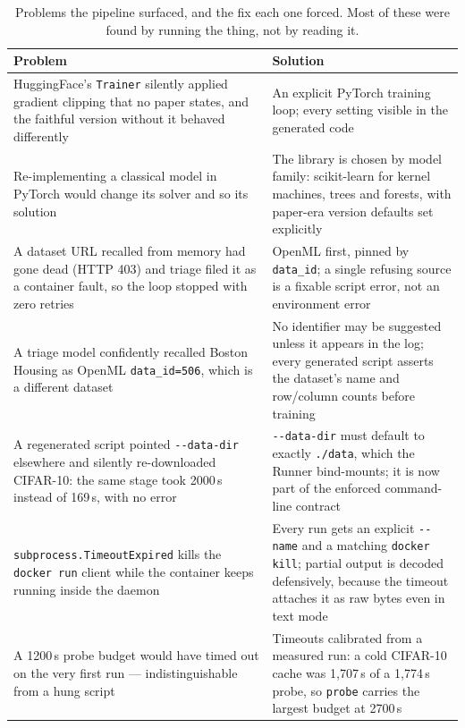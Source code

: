 \documentclass[10pt,twocolumn]{article}
\newcommand{\squeeze}{\setlength{\tabcolsep}{4pt}}
\begin{document}
\begin{table}[tbp]
\centering
\small
\caption{Problems the pipeline surfaced, and the fix each one forced. Most of these were found by
running the thing, not by reading it.}
\label{tab:problems}
\squeeze
\begin{tabular}{L{0.47\textwidth}L{0.47\textwidth}}
\toprule
Problem & Solution \\
\midrule
HuggingFace's \texttt{Trainer} silently applied gradient clipping that no paper states, and the
  faithful version without it behaved differently & An explicit PyTorch training loop; every
  setting visible in the generated code \\
Re-implementing a classical model in PyTorch would change its solver and so its solution & The
  library is chosen by model family: scikit-learn for kernel machines, trees and forests, with
  paper-era version defaults set explicitly \\
A dataset URL recalled from memory had gone dead (HTTP 403) and triage filed it as a container
  fault, so the loop stopped with zero retries & OpenML first, pinned by \texttt{data\_id}; a
  single refusing source is a fixable script error, not an environment error \\
A triage model confidently recalled Boston Housing as OpenML \texttt{data\_id=506}, which is a
  different dataset & No identifier may be suggested unless it appears in the log; every generated
  script asserts the dataset's name and row/column counts before training \\
A regenerated script pointed \texttt{-{}-data-dir} elsewhere and silently re-downloaded CIFAR-10:
  the same stage took 2000\,s instead of 169\,s, with no error & \texttt{-{}-data-dir} must default
  to exactly \texttt{./data}, which the Runner bind-mounts; it is now part of the enforced
  command-line contract \\
\texttt{subprocess.TimeoutExpired} kills the \texttt{docker run} client while the container keeps
  running inside the daemon & Every run gets an explicit \texttt{-{}-name} and a matching
  \texttt{docker kill}; partial output is decoded defensively, because the timeout attaches it as
  raw bytes even in text mode \\
A 1200\,s probe budget would have timed out on the very first run --- indistinguishable from a hung
  script & Timeouts calibrated from a measured run: a cold CIFAR-10 cache was 1{,}707\,s of a
  1{,}774\,s probe, so \texttt{probe} carries the largest budget at 2700\,s \\

\end{tabular}
\end{table}
\end{document}

